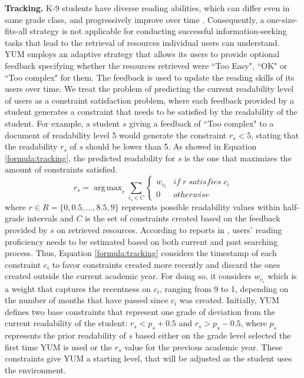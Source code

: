 \documentclass{sig-alternate-05-2015}
\DeclareMathOperator*{\argmaxA}{arg\,max} %
\begin{document}
\noindent
\textbf{Tracking.} K-9 students have diverse reading abilities, which can differ even in same grade class, and progressively improve over time \cite{sh13}. Consequently, a one-size-fits-all strategy is not applicable for conducting successful information-seeking tasks that lead to the retrieval of resources individual users can understand. YUM employs an adaptive strategy that allows its users to provide optional feedback specifying whether the resources retrieved were ``Too Easy", ``OK" or ``Too complex" for them. The feedback is used to update the reading skills of its users over time.    
We treat the problem of predicting the current readability level of users as a constraint satisfaction problem, where each feedback  provided by a student  generates  a constraint that needs to be satisfied by the readability of the student. For example, a student $s$ giving a feedback of ``Too complex" to a document of readability level 5 would generate the constraint $r_s < 5$, stating that the readability $r_s$ of $s$ should be lower than 5. As showed in Equation \ref{formula:tracking}, the predicted readability for $s$ is the one that maximizes the amount of constraints satisfied.
\vspace{0.1cm}
\begin{equation}
r_s = \argmaxA_r  \sum_ {c_{i} \in C} \begin{cases}w_{c_i} & if \; r \;  satisfies \; c_{i}\\0 & otherwise\end{cases}  
\label{formula:tracking}
\end{equation}
\noindent
where $r \in R=\{0,0.5,\dotsc ,8.5,9\}$ represents possible readability values within half-grade intervals and $C$ is the set of constraints created based on the feedback provided by $s$ on retrieved resources. According to reports in \cite{Col11}, users' reading proficiency needs to be estimated based on both current and past searching process. Thus, Equation \ref{formula:tracking} considers the timestamp of each constraint $c_i$ to favor constraints created more recently and discard the ones created outside the current academic year. For doing so, it
considers $w_{c_i}$ which is a weight that captures the recentness on $c_i$, ranging from 9 to 1, depending on the number of months that have passed since $c_i$ was created.
Initially, YUM defines two base constraints that represent one grade of deviation from the current readability of the student: $r_s < p_s+0.5$ and $r_s > p_s -0.5$, where $p_s$ represents the prior readability of $s$ based either on the grade level selected the first time YUM is used or the $r_s$ value for the previous academic year. These constraints give YUM a starting level, that will be adjusted as the student uses the environment. 
\end{document}
